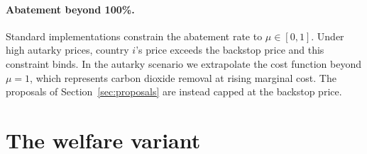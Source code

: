 \documentclass[12pt,english]{article}
\theoremstyle{remark}
\begin{document}

\paragraph{Abatement beyond 100\%.} Standard implementations constrain the abatement rate to $\mu\in[0,1]$. Under high autarky prices, country $i$'s price exceeds the backstop price and this constraint binds. In the autarky scenario we extrapolate the cost function beyond $\mu=1$, which represents carbon dioxide removal at rising marginal cost. The proposals of Section~\ref{sec:proposals} are instead capped at the backstop price.



\clearpage
\section{The welfare variant}
\label{app:eqpc}
\end{document}
